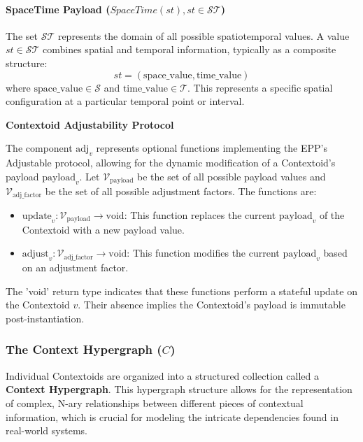             \paragraph[SpaceTime Payload]{SpaceTime Payload (\(SpaceTime(st), st \in \mathcal{ST}\))}\label{par:spacetime_payload}
            
            The set \(\mathcal{ST}\) represents the domain of all possible spatiotemporal values. A value \(st \in \mathcal{ST}\) combines spatial and temporal information, typically as a composite structure:
            \[ st = (\text{space\_value}, \text{time\_value}) \]
            where \(\text{space\_value} \in \mathcal{S}\) and \(\text{time\_value} \in \mathcal{T}\). This represents a specific spatial configuration at a particular temporal point or interval.


\textbf{Contextoid Adjustability Protocol }
        
        The component \( \text{adj}_v \) represents optional functions implementing the EPP's Adjustable protocol, allowing for the dynamic modification of a Contextoid's payload \( \text{payload}_v \).
        Let \(\mathcal{V}_{\text{payload}}\) be the set of all possible payload values and \(\mathcal{V}_{\text{adj\_factor}}\) be the set of all possible adjustment factors. The functions are:
        \begin{itemize}
            \item \( \text{update}_v: \mathcal{V}_{\text{payload}} \to \text{void} \): This function replaces the current \( \text{payload}_v \) of the Contextoid with a new payload value.
            \item \( \text{adjust}_v: \mathcal{V}_{\text{adj\_factor}} \to \text{void} \): This function modifies the current \( \text{payload}_v \) based on an adjustment factor.
        \end{itemize}
        The 'void' return type indicates that these functions perform a stateful update on the Contextoid \(v\). Their absence implies the Contextoid's payload is immutable post-instantiation.

\newpage

\subsubsection[The Context Hypergraph (C)]{The Context Hypergraph (\(C\))}
    \label{ssec:context_hypergraph_formal}

    Individual Contextoids are organized into a structured collection called a \textbf{Context Hypergraph}. This hypergraph structure allows for the representation of complex, N-ary relationships between different pieces of contextual information, which is crucial for modeling the intricate dependencies found in real-world systems.

